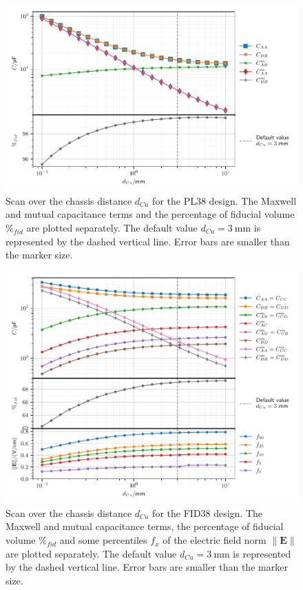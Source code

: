 \begin{figure}
\centering
\includegraphics[scale=1]{Figures/ElectrodesScan/capacitance_fiducial_cu_distance_pl38.pdf}
\caption{Scan over the chassis distance $d_{Cu}$ for the PL38 design. The Maxwell and mutual capacitance terms and the percentage of fiducial volume $\%_{fid}$ are plotted separately. The default value $d_{Cu}=\SI{3}{\mm}$ is represented by the dashed vertical line. Error bars are smaller than the marker size.}
\label{fig:capacitance-fiducial-cu-distance-pl38}
\end{figure}

\begin{figure}
\centering
\includegraphics[scale=1]{Figures/ElectrodesScan/capacitance_fiducial_cu_distance.pdf}
\caption{Scan over the chassis distance $d_{Cu}$ for the FID38 design. The Maxwell and mutual capacitance terms, the percentage of fiducial volume $\%_{fid}$ and some percentiles $f_x$ of the electric field norm $\| \mathbf{E} \|$ are plotted separately. The default value $d_{Cu}=\SI{3}{\mm}$ is represented by the dashed vertical line. Error bars are smaller than the marker size.}
\label{fig:capacitance-fiducial-cu-distance}
\end{figure}

